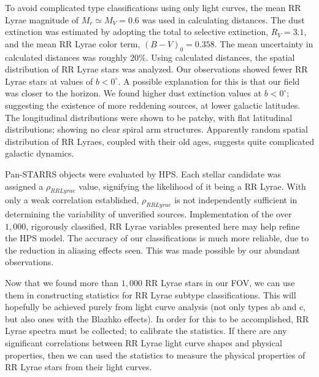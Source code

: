 \documentclass[aps,prb,twocolumn,superscriptaddress]{revtex4-1}
\begin{document}
\indent To avoid complicated type classifications using only light curves, the mean RR Lyrae magnitude of $M_r \simeq M_V = 0.6$ was used in calculating distances. The dust extinction was estimated by adopting the total to selective extinction, $R_V=3.1$, and the mean RR Lyrae color term, $(B-V)_0 = 0.358$. The mean uncertainty in calculated distances was roughly $20\%$.  Using calculated distances, the spatial distribution of RR Lyrae stars was analyzed. 
Our observations showed fewer RR Lyrae stars at values of $b<0^{\circ}$.  A possible explanation for this is that our field was closer to the horizon.
We found higher dust extinction values at $b<0^{\circ}$; suggesting the existence of more reddening sources, at lower galactic latitudes.  
The longitudinal distributions were shown to be patchy, with flat latitudinal distributions; showing no clear spiral arm structures. 
Apparently random spatial distribution of RR Lyraes, coupled with their old ages, suggests quite complicated galactic dynamics.


\indent Pan-STARRS objects were evaluated by HPS.  Each stellar candidate was assigned a $\rho_{RRLyrae}$ value, signifying the likelihood of it being a RR Lyrae.  With only a weak correlation established, $\rho_{RRLyrae}$ is not independently sufficient in determining the variability of unverified sources.  Implementation of the over $1,000$, rigorously classified, RR Lyrae variables presented here may help refine the HPS model.  The accuracy of our classifications is much more reliable, due to the reduction in aliasing effects seen.  This was made possible by our abundant observations.


\indent Now that we found more than $1,000$ RR Lyrae stars in our FOV, we can use them in constructing statistics for RR Lyrae subtype classifications.  This will hopefully be achieved purely from light curve analysis (not only types ab and c, but also ones with the Blazhko effects). In order for this to be accomplished, RR Lyrae spectra must be collected; to calibrate the statistics.  
If there are any significant correlations between RR Lyrae light curve shapes and physical properties, then we can used the statistics to measure the physical properties of RR Lyrae stars from their light curves.
\end{document}
